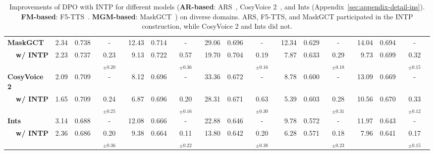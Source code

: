 \documentclass[11pt]{article}
\begin{document}
\begin{table}[t]
\begin{center}
\begin{threeparttable}
{\begin{tabular}{l||rrc|rrc|rrc|rrc||rrc}
    \midrule
    \multicolumn{1}{l||}{\textbf{MaskGCT}}
        & 2.34 & 0.738 & - 
        & 12.43 & 0.714 & - 
        & 29.06 & 0.696 & - 
        & 12.34 & 0.629 & - 
        & 14.04 & 0.694 & - \\
    \multicolumn{1}{r||}{\textbf{w/ INTP}}
        & 2.23 & 0.737 & 0.23 $_{\scriptscriptstyle \pm \text{0.20}}$
        & 9.13 & 0.722 & 0.57 $_{\scriptscriptstyle \pm \text{0.36}}$
        & 19.70 & 0.704 & 0.19 $_{\scriptscriptstyle \pm \text{0.16}}$
        & 7.87 & 0.633 &  0.29 $_{\scriptscriptstyle \pm \text{0.18}}$
        & 9.73 & 0.699 & 0.32 $_{\scriptscriptstyle \pm \text{0.15}}$ \\
    \midrule
    \multicolumn{1}{l||}{\textbf{CosyVoice 2}}
        & 2.09 & 0.709 & - 
        & 8.12 & 0.696 & - 
        & 33.36 & 0.672 & - 
        & 8.78  & 0.600 & - 
        & 13.09 & 0.669 & - \\
    \multicolumn{1}{r||}{\textbf{w/ INTP}}
        & 1.65 & 0.709 & 0.24 $_{\scriptscriptstyle \pm \text{0.25}}$
        & 6.87 & 0.696 & 0.20 $_{\scriptscriptstyle \pm \text{0.16}}$
        & 28.31 & 0.671 & 0.63 $_{\scriptscriptstyle \pm \text{0.30}}$
        & 5.39  & 0.603 & 0.28 $_{\scriptscriptstyle \pm \text{0.31}}$
        & 10.56 & 0.670 & 0.33 $_{\scriptscriptstyle \pm \text{0.12}}$ \\
    \midrule
    \multicolumn{1}{l||}{\textbf{Ints}}
        & 3.14 & 0.688 & -
        & 12.08 & 0.666 & - 
        & 22.88 & 0.646 & - 
        & 9.78  & 0.572 & - 
        & 11.97 & 0.643 & - \\
    \multicolumn{1}{r||}{\textbf{w/ INTP}}
        & 2.36 & 0.686 & 0.20 $_{\scriptscriptstyle \pm \text{0.36}}$
        & 9.38  & 0.664 & 0.11 $_{\scriptscriptstyle \pm \text{0.22}}$
        & 13.80 & 0.642 & 0.20 $_{\scriptscriptstyle \pm \text{0.38}}$
        & 6.28  & 0.571 & 0.18 $_{\scriptscriptstyle \pm \text{0.23}}$
        & 7.96  & 0.641 & 0.17 $_{\scriptscriptstyle \pm \text{0.15}}$ \\
    \bottomrule
    \end{tabular}
    }
\end{threeparttable}
\caption{Improvements of DPO with INTP for different models (\textbf{AR-based}: ARS~\cite{maskgct}, CosyVoice 2~\cite{cosyvoice}, and Ints (Appendix~\ref{sec:appendix-detail-ins}). \textbf{FM-based}: F5-TTS~\cite{f5tts}. \textbf{MGM-based}: MaskGCT~\cite{maskgct}) on diverse domains. ARS, F5-TTS, and MaskGCT participated in the INTP construction, while CosyVoice 2 and Ints did not.}
\vspace{-3mm}
\label{tab:expt-main}
\end{center}
\end{table}
\end{document}
